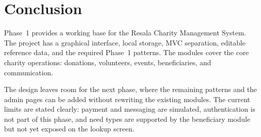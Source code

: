 \section{Conclusion}

Phase~1 provides a working base for the Resala Charity Management System. The project has a graphical interface, local storage, MVC separation, editable reference data, and the required Phase~1 patterns. The modules cover the core charity operations: donations, volunteers, events, beneficiaries, and communication.

The design leaves room for the next phase, where the remaining patterns and the admin pages can be added without rewriting the existing modules. The current limits are stated clearly: payment and messaging are simulated, authentication is not part of this phase, and need types are supported by the beneficiary module but not yet exposed on the lookup screen.
